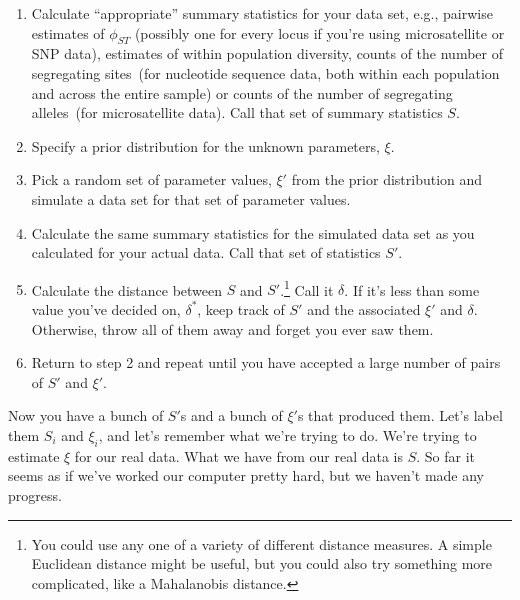 \documentclass[12pt]{article}
\begin{document}
\begin{enumerate}

\item Calculate ``appropriate'' summary statistics for your data set,
  e.g., pairwise estimates of $\phi_{ST}$ (possibly one for every
  locus if you're using microsatellite or SNP data), estimates of
  within population diversity, counts of the number of segregating
  sites~(for nucleotide sequence data, both within each population and
  across the entire sample) or counts of the number of segregating
  alleles~(for microsatellite data). Call that set of summary
  statistics $S$.

\item Specify a prior distribution for the unknown parameters, $\xi$.

\item Pick a random set of parameter values, $\xi'$ from the prior
  distribution and simulate a data set for that set of parameter
  values.

\item Calculate the same summary statistics for the simulated
  data set as you calculated for your actual data. Call that set of
  statistics $S'$. 

\item Calculate the distance between $S$ and $S'$.\footnote{You could
    use any one of a variety of different distance measures. A simple
    Euclidean distance might be useful, but you could also try
    something more complicated, like a Mahalanobis distance.} Call it
  $\delta$. If it's less than some value you've decided on,
  $\delta^*$, keep track of $S'$ and the associated $\xi'$ and
  $\delta$. Otherwise, throw all of them away and forget you ever saw
  them.

\item Return to step 2 and repeat until you have accepted a large
  number of pairs of $S'$ and $\xi'$.

\end{enumerate}

Now you have a bunch of $S'$s and a bunch of $\xi'$s that produced
them. Let's label them $S_i$ and $\xi_i$, and let's remember what
we're trying to do. We're trying to estimate $\xi$ for our real
data. What we have from our real data is $S$. So far it seems as if
we've worked our computer pretty hard, but we haven't made any
progress. 
\end{document}
